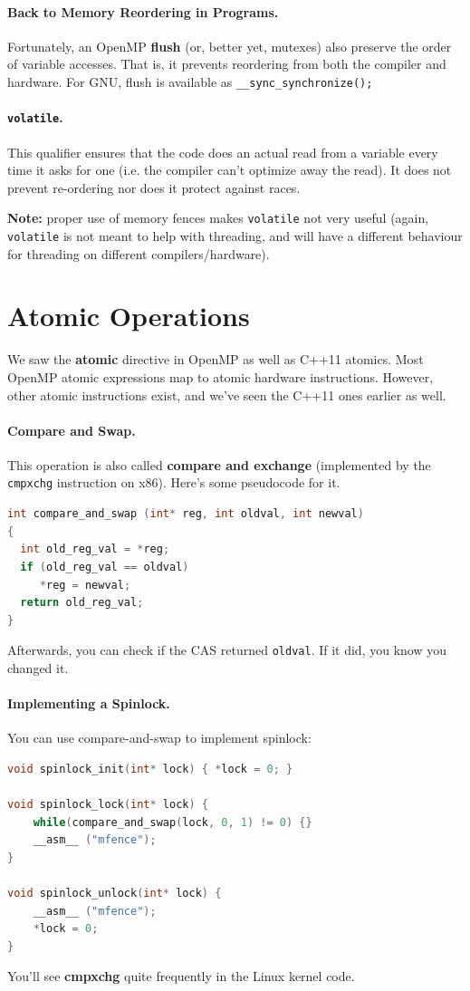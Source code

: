\documentclass[a4paper]{report}
\begin{document}
\paragraph{Back to Memory Reordering in Programs.}
    Fortunately, an OpenMP {\bf flush} (or, better yet, mutexes) also preserve the order of variable accesses.
    That is, it prevents reordering from both the compiler and hardware.
    For GNU, flush is available as
      {\tt \_\_sync\_synchronize();}

\paragraph{{\tt volatile}.} This qualifier ensures that the
code does an actual read from a variable every time it asks for one
(i.e. the compiler can't optimize away the read). It does not prevent
re-ordering nor does it protect against races.

{\bf Note:} proper use of memory fences makes {\tt volatile} not very
useful (again, {\tt volatile} is not meant to help with threading, and
will have a different behaviour for threading on different
compilers/hardware).

\section*{Atomic Operations}
 We saw the {\bf atomic} directive in OpenMP as well as C++11 atomics. Most OpenMP atomic expressions map to atomic hardware instructions.
However, other atomic instructions exist, and we've seen the C++11 ones earlier as well.

\paragraph{Compare and Swap.} This operation is also called {\bf compare and exchange} (implemented by the {\tt cmpxchg} instruction on x86).
Here's some pseudocode for it.
  \begin{lstlisting}[language=C]
int compare_and_swap (int* reg, int oldval, int newval) 
{
  int old_reg_val = *reg;
  if (old_reg_val == oldval) 
     *reg = newval;
  return old_reg_val;
}
  \end{lstlisting}

Afterwards, you can check if the CAS returned {\tt oldval}. If it did, you know you changed it.


\paragraph{Implementing a Spinlock.}
You can use compare-and-swap to implement spinlock:
  \begin{lstlisting}[language=C]
void spinlock_init(int* lock) { *lock = 0; }

void spinlock_lock(int* lock) {
    while(compare_and_swap(lock, 0, 1) != 0) {}
    __asm__ ("mfence");
}

void spinlock_unlock(int* lock) {
    __asm__ ("mfence");
    *lock = 0;  
}
  \end{lstlisting}
You'll see {\bf cmpxchg} quite frequently in the Linux kernel code.
\end{document}
